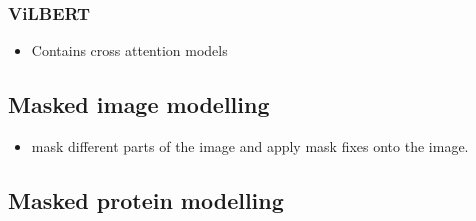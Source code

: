 \documentclass[11pt]{article}
\begin{document}
\subsubsection{ViLBERT}

\begin{minipage}[l]{.5\linewidth}
    \begin{figure}[H]
        \centering
    \end{figure}    
\end{minipage}\hfill
\begin{minipage}[r]{.48\linewidth}
    \begin{itemize}
        \item Contains cross attention models
    \end{itemize}
\end{minipage}

\subsection{Masked image modelling}

\begin{minipage}[l]{.5\linewidth}
    \begin{figure}[H]
        \centering
    \end{figure}    
\end{minipage}\hfill
\begin{minipage}[r]{.48\linewidth}
    \begin{itemize}
        \item mask different parts of the image and apply mask fixes onto the image.
    \end{itemize}
\end{minipage}

\subsection{Masked protein modelling}

\begin{figure}[H]
    \centering
\end{figure}    
\end{document}
